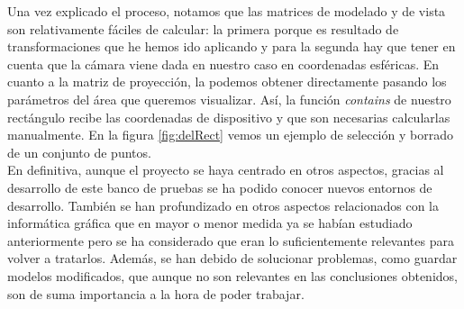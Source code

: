Una vez explicado el proceso, notamos que las matrices de modelado y de vista son relativamente fáciles de calcular: la primera porque es resultado de transformaciones que he hemos ido aplicando y para la segunda hay que tener en cuenta que la cámara viene dada en nuestro caso en coordenadas esféricas. En cuanto a la matriz de proyección, la podemos obtener directamente pasando los parámetros del área que queremos visualizar. Así, la función \textit{contains} de nuestro rectángulo recibe las coordenadas de dispositivo y que son necesarias calcularlas manualmente. En la figura \ref{fig:delRect} vemos un ejemplo de selección y borrado de un conjunto de puntos. \\

En definitiva, aunque el proyecto se haya centrado en otros aspectos, gracias al desarrollo de este banco de pruebas se ha podido conocer nuevos entornos de desarrollo. También se han profundizado en otros aspectos relacionados con la informática  gráfica que en mayor o menor medida ya se habían estudiado anteriormente pero se ha considerado que eran lo suficientemente relevantes para volver a tratarlos. Además, se han debido de solucionar problemas, como guardar modelos modificados, que aunque no son relevantes en las conclusiones obtenidos, son de suma importancia a la hora de poder trabajar.